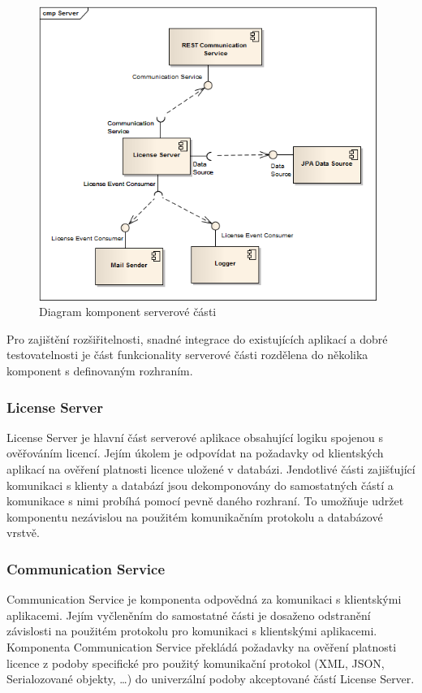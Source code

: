 \begin{figure}[tbh]
\begin{center}
\includegraphics[width=11cm]{figures/components-server.png}
\caption{Diagram komponent serverové části}
\label{fig:components-server} 
\end{center}
\end{figure}

Pro zajištění rozšiřitelnosti, snadné integrace do existujících aplikací a dobré
testovatelnosti je část funkcionality serverové části rozdělena do několika
komponent s definovaným rozhraním.

\subsubsection*{License Server}

License Server je hlavní část serverové aplikace obsahující logiku spojenou s
ověřováním licencí. Jejím úkolem je odpovídat na požadavky od klientských aplikací na
ověření platnosti licence uložené v databázi. Jendotlivé části zajišťující
komunikaci s klienty a databází jsou dekomponovány do samostatných částí a
komunikace s nimi probíhá pomocí pevně daného rozhraní. To umožňuje udržet
komponentu nezávislou na použitém komunikačním protokolu a databázové vrstvě.

\subsubsection*{Communication Service}
\label{subsec:comm-service}

Communication Service je komponenta odpovědná za komunikaci s klientskými
aplikacemi. Jejím vyčleněním do samostatné části je dosaženo odstranění
závislosti na použitém protokolu pro komunikaci s klientskými aplikacemi.
Komponenta Communication Service překládá požadavky na ověření platnosti licence
z podoby specifické pro použitý komunikační protokol (\gls{XML}, \gls{JSON},
Serialozované objekty, \ldots) do univerzální podoby akceptované částí License Server.

